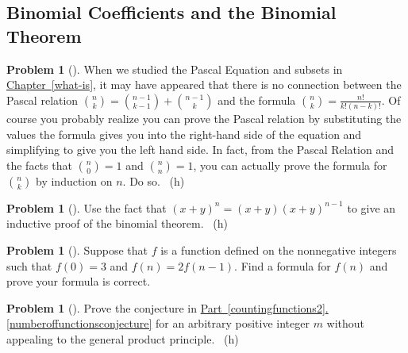 \documentclass[10pt,]{book}
\theoremstyle{plain}
\theoremstyle{definition}
\newtheorem{activity}[project]{Problem}
\theoremstyle{definition}
\numberwithin{equation}{chapter}
\newcommand{\importantarrow}{\Rightarrow}
\begin{document}
\subsection[{Binomial Coefficients and the Binomial Theorem}]{Binomial Coefficients and the Binomial Theorem}\label{subsection-12}
\begin{activity}[] \label{activity-72}
\hypertarget{p-448}{}%
When we studied the Pascal Equation and subsets in \hyperref[what-is]{Chapter~\ref{what-is}}, it may have appeared that there is no connection between the Pascal relation \(\binom{n}{k} = \binom{n-1}{k-1} +\binom{n-1}{k}\) and the formula \(\binom{n}{k}=\frac{n!}{k!(n-k)!}\). Of course you probably realize you can prove the Pascal relation by substituting the values the formula gives you into the right-hand side of the equation and simplifying to give you the left hand side. In fact, from the Pascal Relation and the facts that \(\binom{n}{0}=1\) and \(\binom{n}{n}=1\), you can actually prove the formula for \(\binom{n}{k}\) by induction on \(n\). Do so.%
~{\tiny (h)}\end{activity}
\begin{activity}[]\marginsymbol[-1em]{\pdftooltip{$\importantarrow$}{especially interesting}} \label{activity-73}
\hypertarget{p-452}{}%
Use the fact that \((x+y)^n = (x+y)(x+y)^{n-1}\) to give an inductive proof of the binomial theorem.%
~{\tiny (h)}\end{activity}
\begin{activity}[]\marginsymbol[-1em]{} \label{activity-74}
\hypertarget{p-457}{}%
Suppose that \(f\) is a function defined on the nonnegative integers such that \(f(0)=3\) and \(f(n)=2f(n-1)\). Find a formula for \(f(n)\) and prove your formula is correct.%
\end{activity}
\begin{activity}[]\marginsymbol[-1em]{} \label{altproofnumberoffunctionsconjecture}
\hypertarget{p-459}{}%
Prove the conjecture in \hyperref[numberoffunctionsconjecture]{Part~\ref{countingfunctions2}.\ref{numberoffunctionsconjecture}} for an arbitrary positive integer \(m\) without appealing to the general product principle.%
~{\tiny (h)}\end{activity}
\typeout{************************************************}
\typeout{************************************************}
\end{document}
